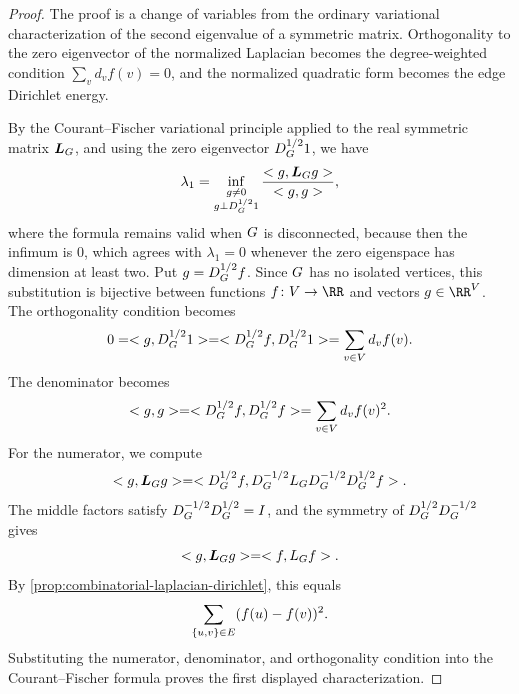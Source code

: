 \begin{proof}
	The proof is a change of variables from the ordinary variational characterization of the second eigenvalue of a symmetric matrix. Orthogonality to the zero eigenvector of the normalized Laplacian becomes the degree-weighted condition \(\sum_v d_v f(v)=0\), and the normalized quadratic form becomes the edge Dirichlet energy.

	By the Courant--Fischer variational principle applied to the real symmetric matrix \(\boldsymbol{L}_{G}\), and using the zero eigenvector \(D_{G}^{1/2}1\), we have
	\begin{equation}
		\lambda_1
		=
		\inf_{\substack{g\neq 0\\g\perp D_{G}^{1/2}1}}
		\frac{< g,\boldsymbol{L}_{G}g>}{< g,g>},
	\end{equation}
	where the formula remains valid when \(G\) is disconnected, because then the infimum is \(0\), which agrees with \(\lambda_1=0\) whenever the zero eigenspace has dimension at least two. Put \(g=D_{G}^{1/2}f\). Since \(G\) has no isolated vertices, this substitution is bijective between functions \(f\colon \Vertices\to\RR\) and vectors \(g\in\RR^\Vertices\). The orthogonality condition becomes
	\begin{equation}
		0=< g,D_{G}^{1/2}1>
		=
		< D_{G}^{1/2}f,D_{G}^{1/2}1>
		=
		\sum_{v\in V}d_v f(v).
	\end{equation}
	The denominator becomes
	\begin{equation}
		< g,g>
		=
		< D_{G}^{1/2}f,D_{G}^{1/2}f>
		=
		\sum_{v\in V}d_v f(v)^2.
	\end{equation}
	For the numerator, we compute
	\begin{equation}
		< g,\boldsymbol{L}_{G}g>
		=
		< D_{G}^{1/2}f,D_{G}^{-1/2}L_{G}D_{G}^{-1/2}D_{G}^{1/2}f>.
	\end{equation}
	The middle factors satisfy \(D_{G}^{-1/2}D_{G}^{1/2}=I\), and the symmetry of \(D_{G}^{1/2}D_{G}^{-1/2}\) gives
	\begin{equation}
		< g,\boldsymbol{L}_{G}g>=< f,L_{G}f>.
	\end{equation}
	By \cref{prop:combinatorial-laplacian-dirichlet}, this equals
	\begin{equation}
		\sum_{\{u,v\}\in E}(f(u)-f(v))^2.
	\end{equation}
	Substituting the numerator, denominator, and orthogonality condition into the Courant--Fischer formula proves the first displayed characterization.


\end{proof}
